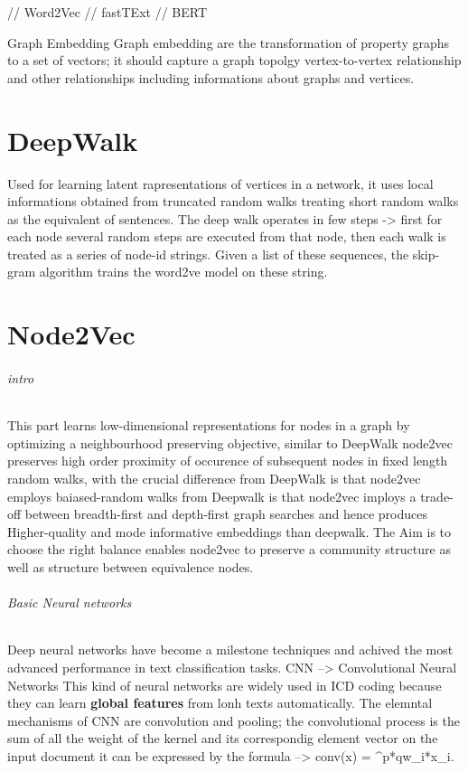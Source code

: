// Word2Vec 
// fastTExt 
// BERT 

Graph Embedding 
Graph embedding are the transformation of property graphs to a set of vectors; it should capture a graph topolgy 
vertex-to-vertex relationship and other relationships including informations about graphs and vertices. 

\part{DeepWalk} 
Used for learning latent rapresentations of vertices in a network, it uses local informations obtained from truncated random walks treating short random walks as the equivalent of sentences. 
The deep walk operates in few steps -> first for each node several random steps are executed from that node, then each walk 
is treated as a series of node-id strings. 
Given a list of these sequences, the skip-gram algorithm trains the word2ve model on these string. 

\part{Node2Vec}
\paragraph{intro}
This part learns low-dimensional representations for nodes in a graph by optimizing a neighbourhood preserving objective, similar to DeepWalk node2vec preserves high order proximity of occurence of subsequent nodes in fixed length random walks, with the crucial difference from DeepWalk is that node2vec employs baiased-random walks from Deepwalk is that node2vec imploys a trade-off between breadth-first and depth-first graph searches and hence produces Higher-quality and mode informative embeddings than deepwalk. 
The Aim is to choose the right balance enables node2vec to preserve a community structure as well as structure between equivalence nodes.

\paragraph{Basic Neural networks}
Deep neural networks have become a milestone techniques and achived the most advanced performance in text classification tasks. 
CNN --> Convolutional Neural Networks 
This kind of neural networks are widely used in ICD coding because they can learn \textbf{global features} from lonh texts automatically. 
The elemntal mechanisms of CNN are convolution and pooling; the convolutional process is the sum of all the weight of the kernel and its correspondig element vector on the input document it can be expressed 
by the formula --> conv(x) = ^{p*q}w_i*x_i. 

